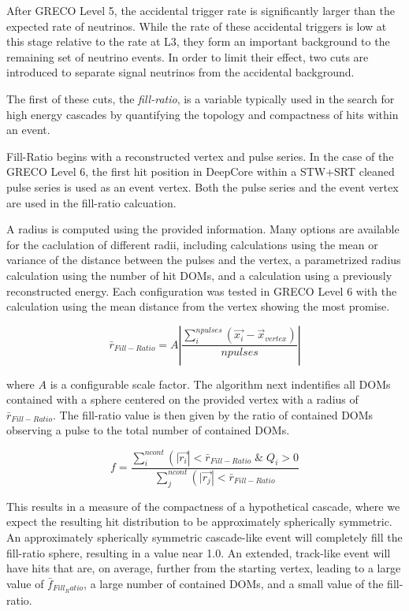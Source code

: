 After GRECO Level 5, the accidental trigger rate is significantly larger than the expected rate of neutrinos.
While the rate of these accidental triggers is low at this stage relative to the rate at L3, they form an important background to the remaining set of neutrino events.
In order to limit their effect, two cuts are introduced to separate signal neutrinos from the accidental background.

The first of these cuts, the \emph{fill-ratio}, is a variable typically used in the search for high energy cascades \cite{IceCube-ICRC2013,IceCube-IC22-Astro} by quantifying the topology and compactness of hits within an event.

Fill-Ratio begins with a reconstructed vertex and pulse series.
In the case of the GRECO Level 6, the first hit position in DeepCore within a STW+SRT cleaned pulse series is used as an event vertex.
Both the pulse series and the event vertex are used in the fill-ratio calcuation.

A radius is computed using the provided information.
Many options are available for the caclulation of different radii, including calculations using the mean or variance of the distance between the pulses and the vertex, a parametrized radius calculation using the number of hit DOMs, and a calculation using a previously reconstructed energy.
Each configuration was tested in GRECO Level 6 with the calculation using the mean distance from the vertex showing the most promise.

\begin{equation}
	\bar{r}_{Fill-Ratio} = A \left|\frac{\sum_i^{npulses} \left(\vec{x_i}-\vec{x}_{vertex}\right)}{npulses}\right|
\end{equation}

where $A$ is a configurable scale factor. 
The algorithm next indentifies all DOMs contained with a sphere centered on the provided vertex with a radius of $\bar{r}_{Fill-Ratio}$.
The fill-ratio value is then given by the ratio of contained DOMs observing a pulse to the total number of contained DOMs.

\begin{equation}
	f = \frac{\sum_i^{ncont} \left(|\vec{r_i}\right|<\bar{r}_{Fill-Ratio} \;\&\; Q_i>0}{\sum_j^{ncont} \left(|\vec{r_j}\right|<\bar{r}_{Fill-Ratio}}
\end{equation}

This results in a measure of the compactness of a hypothetical cascade, where we expect the resulting hit distribution to be approximately spherically symmetric.
An approximately spherically symmetric cascade-like event will completely fill the fill-ratio sphere, resulting in a value near 1.0.
An extended, track-like event will have hits that are, on average, further from the starting vertex, leading to a large value of $\bar{f}_{Fill_Ratio}$, a large number of contained DOMs, and a small value of the fill-ratio.


